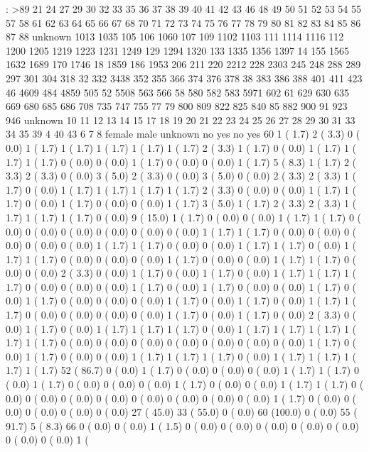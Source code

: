   :  >89 21 24 27 29 30 32 33 35 36 37 38 39 40 41 42 43 46 48 49 50 51 52 53 54 55 57 58 61 62 63 64 65 66 67 68 70 71 72 73 74 75 76 77 78 79 80 81 82 83 84 85 86 87 88  unknown 1013 1035 105 106 1060 107 109 1102 1103 111 1114 1116 112 1200 1205 1219 1223 1231 1249 129 1294 1320 133 1335 1356 1397 14 155 1565 1632 1689 170 1746 18 1859 186 1953 206 211 220 2212 228 2303 245 248 288 289 297 301 304 318 32 332 3438 352 355 366 374 376 378 38 383 386 388 401 411 423 46 4609 484 4859 505 52 5508 563 566 58 580 582 583 5971 602 61 629 630 635 669 680 685 686 708 735 747 755 77 79 800 809 822 825 840 85 882 900 91 923 946  unknown 10 11 12 13 14 15 17 18 19 20 21 22 23 24 25 26 27 28 29 30 31 33 34 35 39 4 40 43 6 7 8  female  male  unknown  no  yes  no  yes 60  1 (  1.7)   2 (  3.3)   0 (  0.0)   1 (  1.7)   1 (  1.7)   1 (  1.7)   1 (  1.7)   1 (  1.7)   2 (  3.3)   1 (  1.7)   0 (  0.0)   1 (  1.7)   1 (  1.7)   1 (  1.7)   0 (  0.0)   0 (  0.0)   1 (  1.7)   0 (  0.0)   0 (  0.0)   1 (  1.7)   5 (  8.3)   1 (  1.7)   2 (  3.3)   2 (  3.3)   0 (  0.0)   3 (  5.0)   2 (  3.3)   0 (  0.0)   3 (  5.0)   0 (  0.0)   2 (  3.3)   2 (  3.3)   1 (  1.7)   0 (  0.0)   1 (  1.7)   1 (  1.7)   1 (  1.7)   1 (  1.7)   2 (  3.3)   0 (  0.0)   0 (  0.0)   1 (  1.7)   1 (  1.7)   0 (  0.0)   1 (  1.7)   0 (  0.0)   0 (  0.0)   1 (  1.7)   3 (  5.0)   1 (  1.7)   2 (  3.3)   2 (  3.3)   1 (  1.7)   1 (  1.7)   1 (  1.7)   0 (  0.0)   9 ( 15.0)   1 (  1.7)   0 (  0.0)   0 (  0.0)   1 (  1.7)   1 (  1.7)   0 (  0.0)   0 (  0.0)   0 (  0.0)   0 (  0.0)   0 (  0.0)   0 (  0.0)   1 (  1.7)   1 (  1.7)   0 (  0.0)   0 (  0.0)   0 (  0.0)   0 (  0.0)   0 (  0.0)   1 (  1.7)   1 (  1.7)   0 (  0.0)   0 (  0.0)   1 (  1.7)   1 (  1.7)   0 (  0.0)   1 (  1.7)   1 (  1.7)   0 (  0.0)   0 (  0.0)   0 (  0.0)   1 (  1.7)   0 (  0.0)   0 (  0.0)   1 (  1.7)   1 (  1.7)   0 (  0.0)   0 (  0.0)   2 (  3.3)   0 (  0.0)   1 (  1.7)   0 (  0.0)   1 (  1.7)   0 (  0.0)   1 (  1.7)   1 (  1.7)   1 (  1.7)   0 (  0.0)   0 (  0.0)   0 (  0.0)   1 (  1.7)   0 (  0.0)   1 (  1.7)   0 (  0.0)   0 (  0.0)   1 (  1.7)   0 (  0.0)   1 (  1.7)   0 (  0.0)   0 (  0.0)   0 (  0.0)   1 (  1.7)   0 (  0.0)   1 (  1.7)   0 (  0.0)   1 (  1.7)   1 (  1.7)   0 (  0.0)   0 (  0.0)   0 (  0.0)   0 (  0.0)   1 (  1.7)   0 (  0.0)   1 (  1.7)   0 (  0.0)   2 (  3.3)   0 (  0.0)   1 (  1.7)   0 (  0.0)   1 (  1.7)   1 (  1.7)   1 (  1.7)   0 (  0.0)   1 (  1.7)   1 (  1.7)   1 (  1.7)   1 (  1.7)   1 (  1.7)   0 (  0.0)   0 (  0.0)   0 (  0.0)   0 (  0.0)   0 (  0.0)   0 (  0.0)   0 (  0.0)   1 (  1.7)   0 (  0.0)   1 (  1.7)   0 (  0.0)   0 (  0.0)   1 (  1.7)   1 (  1.7)   1 (  1.7)   0 (  0.0)   1 (  1.7)   1 (  1.7)   1 (  1.7)   1 (  1.7)  52 ( 86.7)   0 (  0.0)   1 (  1.7)   0 (  0.0)   0 (  0.0)   0 (  0.0)   1 (  1.7)   1 (  1.7)   0 (  0.0)   1 (  1.7)   0 (  0.0)   0 (  0.0)   0 (  0.0)   1 (  1.7)   0 (  0.0)   0 (  0.0)   1 (  1.7)   1 (  1.7)   0 (  0.0)   0 (  0.0)   0 (  0.0)   0 (  0.0)   0 (  0.0)   0 (  0.0)   0 (  0.0)   0 (  0.0)   1 (  1.7)   0 (  0.0)   0 (  0.0)   0 (  0.0)   0 (  0.0)   0 (  0.0)  27 ( 45.0)  33 ( 55.0)   0 (  0.0)  60 (100.0)   0 (  0.0)  55 ( 91.7)   5 (  8.3)  66  0 (  0.0)   0 (  0.0)   1 (  1.5)   0 (  0.0)   0 (  0.0)   0 (  0.0)   0 (  0.0)   0 (  0.0)   0 (  0.0)   0 (  0.0)   1 (  